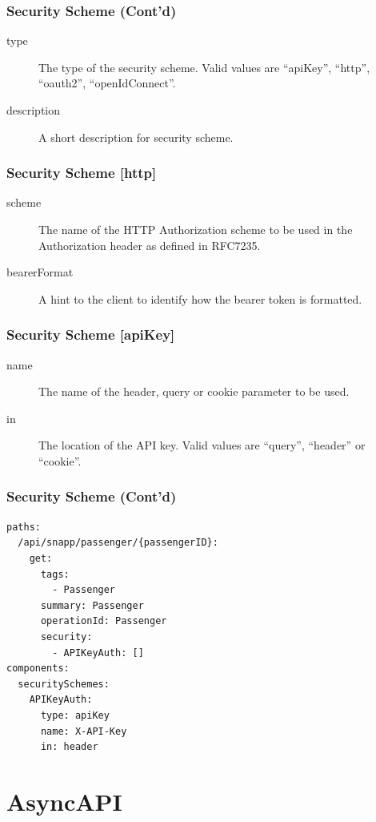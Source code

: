\documentclass{efd-lecture}
\begin{document}
\begin{frame}
  \frametitle{Security Scheme (Cont'd)}
  \begin{description}
    \item[type] The type of the security scheme. Valid values are ``apiKey'', ``http'', ``oauth2'', ``openIdConnect''.
    \item[description] A short description for security scheme.
  \end{description}
\end{frame}

\begin{frame}
  \frametitle{Security Scheme [http]}
  \begin{description}
    \item[scheme] The name of the HTTP Authorization scheme to be used in the Authorization header as defined in RFC7235.
    \item[bearerFormat] A hint to the client to identify how the bearer token is formatted.
  \end{description}
\end{frame}

\begin{frame}
  \frametitle{Security Scheme [apiKey]}
  \begin{description}
    \item[name] The name of the header, query or cookie parameter to be used.
    \item[in] The location of the API key. Valid values are ``query'', ``header'' or ``cookie''.
  \end{description}
\end{frame}

\begin{frame}[fragile]
  \frametitle{Security Scheme (Cont'd)}
  \scriptsize
  \begin{verbatim}
paths:
  /api/snapp/passenger/{passengerID}:
    get:
      tags:
        - Passenger
      summary: Passenger
      operationId: Passenger
      security:
        - APIKeyAuth: []
components:
  securitySchemes:
    APIKeyAuth:
      type: apiKey
      name: X-API-Key
      in: header
  \end{verbatim}
\end{frame}

\section{AsyncAPI}
\end{document}
